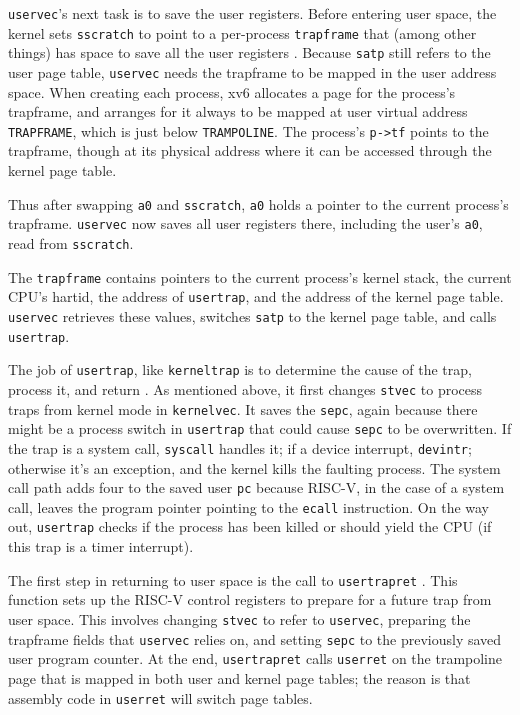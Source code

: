{\tt uservec}'s next task is to save the user registers. Before
entering user space, the kernel sets {\tt sscratch} to point to a
per-process {\tt trapframe} that (among other things) has space to
save all the user registers
. Because {\tt satp} still
refers to the user page table, {\tt uservec} needs the trapframe to be
mapped in the user address space. When creating each process, xv6
allocates a page for the process's trapframe, and arranges for it
always to be mapped at user virtual address {\tt TRAPFRAME}, which is
just below {\tt TRAMPOLINE}. The process's {\tt p->tf} points to the
trapframe, though at its physical address where it can be accessed
through the kernel page table.

Thus after swapping {\tt a0} and {\tt sscratch}, {\tt a0}
holds a pointer to the current process's trapframe.
{\tt uservec} now saves all user registers there,
including the user's {\tt a0}, read from {\tt sscratch}.

The {\tt trapframe} contains pointers to the current process's
kernel stack, the current CPU's hartid, the address of {\tt usertrap},
and the address of the kernel page table. {\tt uservec}
retrieves these values, switches {\tt satp} to the kernel page table,
and calls {\tt usertrap}.

The job of {\tt usertrap}, like {\tt kerneltrap} is to determine
the cause of the trap, process it, and return
.
As mentioned above, it first changes {\tt stvec} to process
traps from kernel mode in {\tt kernelvec}.
It saves the {\tt sepc}, again because there might be a
process switch in {\tt usertrap} that could cause {\tt sepc}
to be overwritten.
If the trap is a system call, {\tt syscall} handles it;
if a device interrupt, {\tt devintr};
otherwise it's an exception, and the kernel kills the
faulting process.
The system call path adds four to the saved user {\tt pc}
because RISC-V, in the case of a system call,
leaves the program pointer pointing to the {\tt ecall} instruction.
On the way out, {\tt usertrap} checks if the process has been
killed or should yield the CPU (if this trap is a timer interrupt).

The first step in returning to user space is the call to {\tt usertrapret}
.
This function sets up the RISC-V control registers to prepare for a
future trap from user space. This involves changing {\tt stvec}
to refer to {\tt uservec}, preparing the trapframe fields that
{\tt uservec} relies on, and setting {\tt sepc} to the previously
saved user program counter. At the end, {\tt usertrapret}
calls {\tt userret} on the trampoline page that is mapped in
both user and kernel page tables; the reason is that assembly
code in {\tt userret} will switch page tables.

